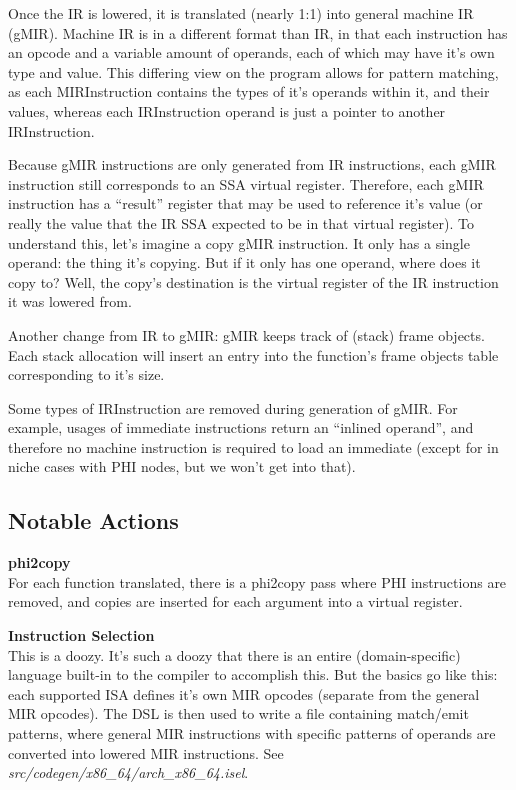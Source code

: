 \documentclass[12pt]{article}
\begin{document}
Once the IR is lowered, it is translated (nearly 1:1) into general machine IR (gMIR). Machine IR is in a different format than IR, in that each instruction has an opcode and a variable amount of operands, each of which may have it's own type and value. This differing view on the program allows for pattern matching, as each MIRInstruction contains the types of it's operands within it, and their values, whereas each IRInstruction operand is just a pointer to another IRInstruction.

Because gMIR instructions are only generated from IR instructions, each gMIR instruction still corresponds to an SSA virtual register. Therefore, each gMIR instruction has a ``result'' register that may be used to reference it's value (or really the value that the IR SSA expected to be in that virtual register). To understand this, let's imagine a copy gMIR instruction. It only has a single operand: the thing it's copying. But if it only has one operand, where does it copy to? Well, the copy's destination is the virtual register of the IR instruction it was lowered from.

Another change from IR to gMIR: gMIR keeps track of (stack) frame objects. Each stack allocation will insert an entry into the function's frame objects table corresponding to it's size.

Some types of IRInstruction are removed during generation of gMIR. For example, usages of immediate instructions return an ``inlined operand'', and therefore no machine instruction is required to load an immediate (except for in niche cases with PHI nodes, but we won't get into that).


\subsection{Notable Actions}
\label{subsec:general-machine-ir:notable-actions}

\noindent\textbf{phi2copy}\\
\noindent For each function translated, there is a phi2copy pass where PHI instructions are removed, and copies are inserted for each argument into a virtual register.

\noindent\textbf{Instruction Selection}\\
\noindent This is a doozy. It's such a doozy that there is an entire (domain-specific) language built-in to the compiler to accomplish this. But the basics go like this: each supported ISA defines it's own MIR opcodes (separate from the general MIR opcodes). The DSL is then used to write a file containing match/emit patterns, where general MIR instructions with specific patterns of operands are converted into lowered MIR instructions. See \emph{src/codegen/x86\_64/arch\_x86\_64.isel}.
\end{document}
